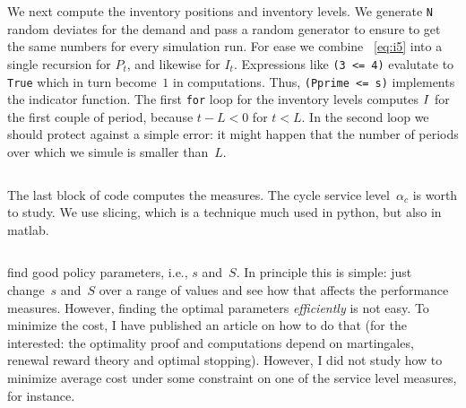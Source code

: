 \documentclass[queueing-book.tex]{subfiles}
\begin{document}
We next compute the inventory positions and inventory levels.
We generate \texttt{N} random deviates for the demand and pass a random generator to ensure to get the same numbers for every simulation run.
For ease we combine ~\cref{eq:i5} into a single recursion for $P_t$, and likewise for $I_t$.
Expressions like \texttt{(3 <= 4)} evalutate to \texttt{True} which in turn become~$1$ in computations.
Thus, \texttt{(Pprime <= s)} implements the indicator function.
The first \texttt{for} loop for the inventory levels computes $I$ for the first couple of period, because $t-L< 0$ for $t< L$.
In the second loop we should protect against a simple error: it might happen that the number of periods over which we simule is smaller than~$L$.
\inputminted[firstline=24, lastline=41]{python}{../code/ss_inventory_simulation.py} %

The last block of code computes the measures.
The cycle service level~$\alpha_{c}$ is worth to study.
We use slicing, which is a technique  much used in python, but also in matlab.
\inputminted[firstline=45, lastline=58]{python}{../code/ss_inventory_simulation.py} %


 find good policy parameters, i.e., $s$ and~$S$.
In principle this is simple: just change~$s$ and~$S$ over a range of values and see how that affects the performance measures.
However, finding the optimal parameters \emph{efficiently} is not easy.
To minimize the cost, I have published an article on how to do that (for the interested: the optimality proof and computations depend on martingales, renewal reward theory and optimal stopping).
However, I did not study how to minimize average cost under some constraint on one of the service level measures, for instance.




\end{document}
